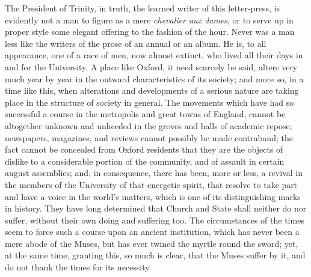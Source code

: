 The President of Trinity, in
truth, the learned writer of this letter-press, is evidently not a man
to figure as a mere \emph{chevalier aux dames}, or to serve up in
proper style some elegant offering to the fashion of the hour. Never
was a man less like the writers of the prose of an annual or an album.
He is, to all appearance, one of a race of men, now almost extinct,
who lived all their days in and for the University. A place like
Oxford, it need scarcely be said, alters very much year by year in the
outward characteristics of its society; and more so, in a time like
this, when alterations and developments of a serious nature are taking
place in the structure of society in general. The movements which
have had so successful a course in the metropolis and great
towns of England, cannot be altogether unknown and unheeded in the
groves and halls of academic repose; newspapers, magazines, and
reviews cannot possibly be made contraband; the fact cannot be
concealed from Oxford residents that they are the objects of dislike
to a considerable portion of the community, and of assault in certain
august assemblies; and, in consequence, there has been, more or less,
a revival in the members of the University of that energetic spirit,
that resolve to take part and have a voice in the world's matters,
which is one of its distinguishing marks in history. They have long
determined that Church and State shall neither do nor suffer, without
their own doing and suffering too. The circumstances of the times seem
to force such a course upon an ancient institution, which has never
been a mere abode of the Muses, but has ever twined the myrtle round
the sword; yet, at the same time, granting this, so much is clear,
that the Muses suffer by it, and do not thank the times for its
necessity.

